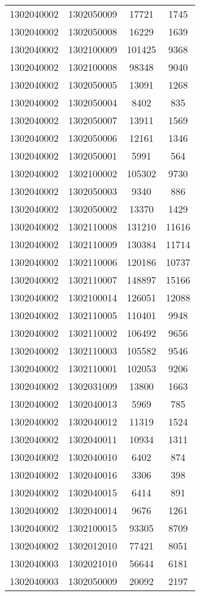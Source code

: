 \begin{longtable}{llcc}
1302040002 & 1302050009 & 17721 & 1745\\
1302040002 & 1302050008 & 16229 & 1639\\
1302040002 & 1302100009 & 101425 & 9368\\
1302040002 & 1302100008 & 98348 & 9040\\
1302040002 & 1302050005 & 13091 & 1268\\
1302040002 & 1302050004 & 8402 & 835\\
1302040002 & 1302050007 & 13911 & 1569\\
1302040002 & 1302050006 & 12161 & 1346\\
1302040002 & 1302050001 & 5991 & 564\\
1302040002 & 1302100002 & 105302 & 9730\\
1302040002 & 1302050003 & 9340 & 886\\
1302040002 & 1302050002 & 13370 & 1429\\
1302040002 & 1302110008 & 131210 & 11616\\
1302040002 & 1302110009 & 130384 & 11714\\
1302040002 & 1302110006 & 120186 & 10737\\
1302040002 & 1302110007 & 148897 & 15166\\
1302040002 & 1302100014 & 126051 & 12088\\
1302040002 & 1302110005 & 110401 & 9948\\
1302040002 & 1302110002 & 106492 & 9656\\
1302040002 & 1302110003 & 105582 & 9546\\
1302040002 & 1302110001 & 102053 & 9206\\
1302040002 & 1302031009 & 13800 & 1663\\
1302040002 & 1302040013 & 5969 & 785\\
1302040002 & 1302040012 & 11319 & 1524\\
1302040002 & 1302040011 & 10934 & 1311\\
1302040002 & 1302040010 & 6402 & 874\\
1302040002 & 1302040016 & 3306 & 398\\
1302040002 & 1302040015 & 6414 & 891\\
1302040002 & 1302040014 & 9676 & 1261\\
1302040002 & 1302100015 & 93305 & 8709\\
1302040002 & 1302012010 & 77421 & 8051\\
1302040003 & 1302021010 & 56644 & 6181\\
1302040003 & 1302050009 & 20092 & 2197\\

\end{longtable}
